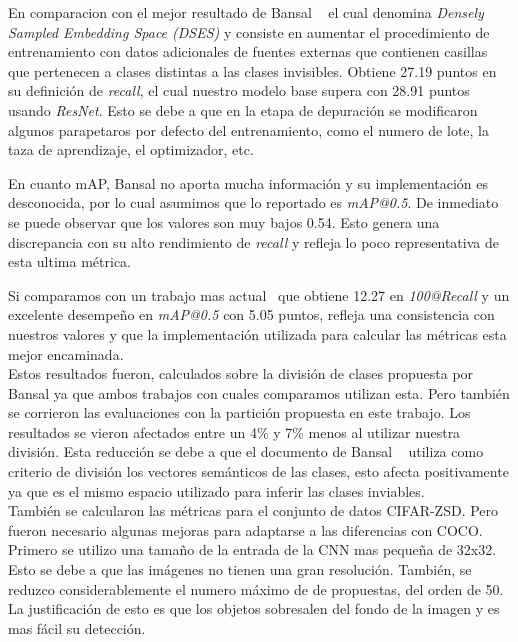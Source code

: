 En comparacion con el mejor resultado de Bansal \etal~\cite{bansal2018zero} el cual denomina \textit{Densely Sampled Embedding Space (DSES)} y consiste en aumentar el procedimiento de entrenamiento con datos adicionales de fuentes externas que contienen casillas que pertenecen a clases distintas a las clases invisibles. Obtiene 27.19 puntos en su definición de \textit{recall}, el cual nuestro modelo base supera con 28.91 puntos usando \textit{ResNet}. Esto se debe a que en la etapa de depuración se modificaron algunos parapetaros por defecto del entrenamiento, como el numero de lote, la taza de aprendizaje, el optimizador, etc.  

En cuanto mAP, Bansal no aporta mucha información y su implementación es desconocida, por lo cual asumimos que lo reportado es \textit{mAP@0.5}. De inmediato se puede observar que los valores son muy bajos 0.54. Esto genera una discrepancia con su alto rendimiento de \textit{recall} y refleja lo poco representativa de esta ultima métrica. 

Si comparamos con un trabajo mas actual~\cite{rahman2020zero} que obtiene 12.27 en \textit{100@Recall} y un excelente desempeño en \textit{mAP@0.5} con 5.05 puntos, refleja una consistencia con nuestros valores y que la implementación utilizada para calcular las métricas esta mejor encaminada.\\
	

Estos resultados fueron, calculados sobre la división de clases propuesta por Bansal ya que ambos trabajos con cuales comparamos utilizan esta. Pero también se corrieron las evaluaciones con la partición propuesta en este trabajo. Los resultados se vieron afectados entre un 4\% y 7\% menos al utilizar nuestra división. Esta reducción se debe a que el documento de Bansal \etal~\cite{bansal2018zero} utiliza como criterio de división los vectores semánticos de las clases, esto afecta positivamente ya que es el mismo espacio utilizado para inferir las clases inviables.\\

También se calcularon las métricas para el conjunto de datos CIFAR-ZSD. Pero fueron necesario algunas mejoras para adaptarse a las diferencias con COCO. Primero se utilizo una tamaño de la entrada de la CNN mas pequeña de 32x32. Esto se debe a que las imágenes no tienen una gran resolución. También, se reduzco considerablemente el numero máximo de de propuestas, del orden de 50. La justificación de esto es que los objetos sobresalen del fondo de la imagen y es mas fácil su detección.


